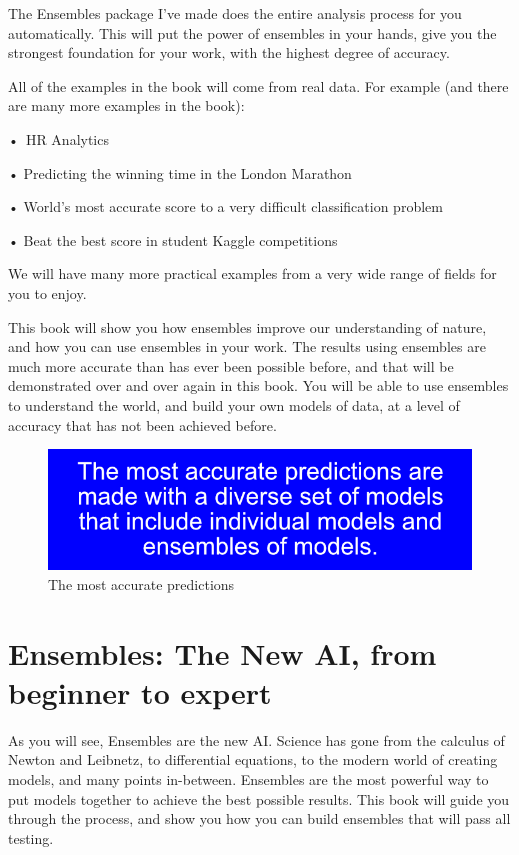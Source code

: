 \documentclass[
]{book}
\begin{document}
The Ensembles package I've made does the entire analysis process for you automatically. This will put the power of ensembles in your hands, give you the strongest foundation for your work, with the highest degree of accuracy.

All of the examples in the book will come from real data. For example (and there are many more examples in the book):

•~HR Analytics

• Predicting the winning time in the London Marathon

• World's most accurate score to a very difficult classification problem

• Beat the best score in student Kaggle competitions

We will have many more practical examples from a very wide range of fields for you to enjoy.

This book will show you how ensembles improve our understanding of nature, and how you can use ensembles in your work. The results using ensembles are much more accurate than has ever been possible before, and that will be demonstrated over and over again in this book. You will be able to use ensembles to understand the world, and build your own models of data, at a level of accuracy that has not been achieved before.

\begin{figure}
\centering
\includegraphics{_book/images/The_most_accurate_predictions.jpg}
\caption{The most accurate predictions}
\end{figure}

\section{Ensembles: The New AI, from beginner to expert}\label{ensembles-the-new-ai-from-beginner-to-expert}

As you will see, Ensembles are the new AI. Science has gone from the calculus of Newton and Leibnetz, to differential equations, to the modern world of creating models, and many points in-between. Ensembles are the most powerful way to put models together to achieve the best possible results. This book will guide you through the process, and show you how you can build ensembles that will pass all testing.
\end{document}
